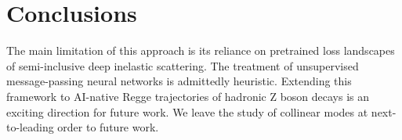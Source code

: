 \section{Conclusions}\label{sec:conclusions}

The main limitation of this approach is its reliance on pretrained loss
landscapes of semi-inclusive deep inelastic scattering. The treatment of
unsupervised message-passing neural networks is admittedly heuristic.
Extending this framework to AI-native Regge trajectories of hadronic Z
boson decays is an exciting direction for future work. We leave the
study of collinear modes at next-to-leading order to future work.

